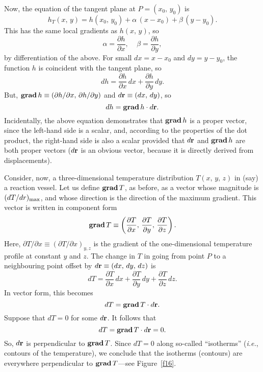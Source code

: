 Now, the equation of the tangent plane at $P=(x_0,\, y_0)$ is
\begin{equation}
h_T(x,\,y)= h(x_0,\,y_0) + \alpha\,(x-x_0)+\beta\,(y-y_0).
\end{equation}
This has the same local gradients as $h(x,\,y)$, so
\begin{equation}
\alpha = \frac{\partial h}{\partial x},~~~~~\beta= \frac{\partial h}{\partial y},
\end{equation}
by differentiation of the above.
For small $dx=x-x_0$ and $dy=y-y_0$, the function $h$ is coincident with the tangent
plane, so
\begin{equation}
dh = \frac{\partial h}{\partial x}\, dx +\frac{\partial h}
{\partial y}\, dy.
\end{equation}
But, ${\bf grad}\,h \equiv (\partial h/\partial x, \,\partial h/\partial y)$ and
$d{\bf r} \equiv (dx, \,dy)$, so
\begin{equation}
dh = {\bf grad}\,h \cdot d{\bf r}.
\end{equation}
Incidentally, the above equation demonstrates that ${\bf grad}\,h$ is a proper vector,
since the left-hand side is a scalar, and, according to the properties of the dot
product, the right-hand side is also a scalar provided that $d{\bf r}$ and
${\bf grad}\,h$ are both 
proper vectors ($d{\bf r}$ is an obvious vector, because it is
directly derived from displacements).

Consider, now, a three-dimensional temperature distribution $T(x,\,y,\,z)$ in 
(say) a
reaction vessel.  Let us define
${\bf grad}\,T$, as before, as a vector whose magnitude is $(dT/dr)_{\rm max}$,
and whose direction is the direction of the maximum gradient. 
This vector is written in component form
\begin{equation}
{\bf grad}\,T \equiv \left(\frac{\partial T}{\partial x}, \,\frac{\partial T}{\partial y},\,
\frac{\partial T}{\partial z}\right).
\end{equation}
Here, $\partial T/\partial x\equiv (\partial T/\partial x)_{y, z}$ is the
gradient of the one-dimensional temperature profile at constant $y$ and $z$. 
The change in $T$ in going from point $P$ to a neighbouring point offset by
$d{\bf r}\equiv (dx,\,dy,\,dz)$ is
\begin{equation}
dT = \frac{\partial T}{\partial x}\,dx +\frac{\partial T}{\partial y}\,dy+
 \frac{\partial T}{\partial z}\,dz.
\end{equation}
In vector form, this becomes
\begin{equation}
dT = {\bf grad}\,T \cdot d{\bf r}.
\end{equation}
Suppose that $dT=0$ for some $d{\bf r}$. It follows that
\begin{equation}
dT = {\bf grad}\,T \cdot d{\bf r} = 0.
\end{equation}
So, $d{\bf r}$ is perpendicular to ${\bf grad}\,T$. Since $dT=0$ along so-called
``isotherms'' ({\em i.e.}, contours of the temperature), we conclude that the isotherms
(contours) are everywhere perpendicular to ${\bf grad}\,T$---see Figure~\ref{f16}.

